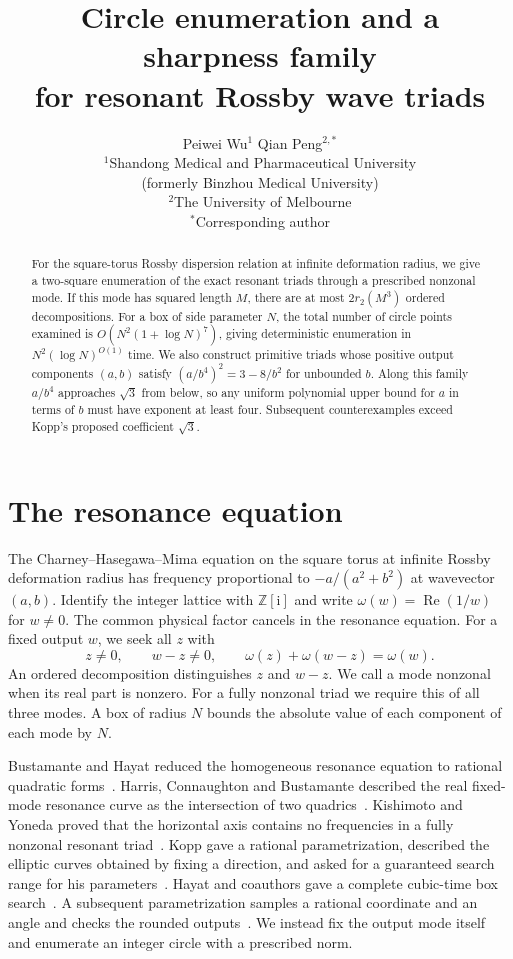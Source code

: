 \documentclass[11pt]{article}
\title{Circle enumeration and a sharpness family\\ for resonant Rossby wave triads}
\author{Peiwei Wu$^{1}$ \qquad Qian Peng$^{2,*}$\\[3pt]
\small $^{1}$Shandong Medical and Pharmaceutical University\\
\small (formerly Binzhou Medical University)\\
\small $^{2}$The University of Melbourne\\
\small $^{*}$Corresponding author}
\date{}
\newcommand{\ZZ}{\mathbb Z}
\newcommand{\ii}{\mathrm i}
\begin{document}
\maketitle
\begin{abstract}
For the square-torus Rossby dispersion relation at infinite deformation radius, we give a two-square enumeration of the exact resonant triads through a prescribed nonzonal mode. If this mode has squared length $M$, there are at most $2r_2(M^3)$ ordered decompositions. For a box of side parameter $N$, the total number of circle points examined is $O(N^2(1+\log N)^7)$, giving deterministic enumeration in $N^2(\log N)^{O(1)}$ time. We also construct primitive triads whose positive output components $(a,b)$ satisfy $(a/b^4)^2=3-8/b^2$ for unbounded $b$. Along this family $a/b^4$ approaches $\sqrt3$ from below, so any uniform polynomial upper bound for $a$ in terms of $b$ must have exponent at least four. Subsequent counterexamples exceed Kopp's proposed coefficient $\sqrt3$.
\end{abstract}

\section{The resonance equation}
The Charney--Hasegawa--Mima equation on the square torus at infinite Rossby deformation radius has frequency proportional to $-a/(a^2+b^2)$ at wavevector $(a,b)$. Identify the integer lattice with $\ZZ[\ii]$ and write $\omega(w)=\operatorname{Re}(1/w)$ for $w\ne0$. The common physical factor cancels in the resonance equation. For a fixed output $w$, we seek all $z$ with
\begin{equation}\label{eq:res}
 z\ne0,\qquad w-z\ne0,\qquad \omega(z)+\omega(w-z)=\omega(w).
\end{equation}
An ordered decomposition distinguishes $z$ and $w-z$. We call a mode nonzonal when its real part is nonzero. For a fully nonzonal triad we require this of all three modes. A box of radius $N$ bounds the absolute value of each component of each mode by $N$.

Bustamante and Hayat reduced the homogeneous resonance equation to rational quadratic forms~\cite{BH}. Harris, Connaughton and Bustamante described the real fixed-mode resonance curve as the intersection of two quadrics~\cite{HCB}. Kishimoto and Yoneda proved that the horizontal axis contains no frequencies in a fully nonzonal resonant triad~\cite{KY}. Kopp gave a rational parametrization, described the elliptic curves obtained by fixing a direction, and asked for a guaranteed search range for his parameters~\cite[\S\S1.7--1.8]{Kopp}. Hayat and coauthors gave a complete cubic-time box search~\cite{HAWB}. A subsequent parametrization samples a rational coordinate and an angle and checks the rounded outputs~\cite[Algorithm~1]{HMB}. We instead fix the output mode itself and enumerate an integer circle with a prescribed norm.
\end{document}
